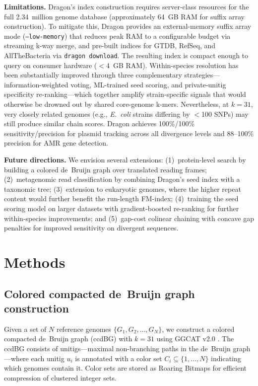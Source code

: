 \documentclass[11pt]{article}
\begin{document}
\textbf{Limitations.} Dragon's index construction requires server-class resources for the full 2.34~million genome database (approximately 64~GB RAM for suffix array construction). To mitigate this, Dragon provides an external-memory suffix array mode (\texttt{--low-memory}) that reduces peak RAM to a configurable budget via streaming k-way merge, and pre-built indices for GTDB, RefSeq, and AllTheBacteria via \texttt{dragon download}. The resulting index is compact enough to query on consumer hardware ($<$4~GB RAM). Within-species resolution has been substantially improved through three complementary strategies---information-weighted voting, ML-trained seed scoring, and private-unitig specificity re-ranking---which together amplify strain-specific signals that would otherwise be drowned out by shared core-genome k-mers. Nevertheless, at $k=31$, very closely related genomes (e.g., \textit{E.~coli} strains differing by $<$100 SNPs) may still produce similar chain scores. Dragon achieves 100\%/100\% sensitivity/precision for plasmid tracking across all divergence levels and 88--100\% precision for AMR gene detection.

\textbf{Future directions.} We envision several extensions: (1)~protein-level search by building a colored de~Bruijn graph over translated reading frames; (2)~metagenomic read classification by combining Dragon's seed index with a taxonomic tree; (3)~extension to eukaryotic genomes, where the higher repeat content would further benefit the run-length FM-index; (4)~training the seed scoring model on larger datasets with gradient-boosted re-ranking for further within-species improvements; and (5)~gap-cost colinear chaining with concave gap penalties for improved sensitivity on divergent sequences.

\section{Methods}

\subsection{Colored compacted de~Bruijn graph construction}

Given a set of $N$ reference genomes $\{G_1, G_2, \ldots, G_N\}$, we construct a colored compacted de~Bruijn graph (ccdBG) with $k = 31$ using GGCAT v2.0 \citep{cracco2023ggcat}. The ccdBG consists of unitigs---maximal non-branching paths in the de~Bruijn graph---where each unitig $u_i$ is annotated with a color set $C_i \subseteq \{1, \ldots, N\}$ indicating which genomes contain it. Color sets are stored as Roaring Bitmaps \citep{lemire2018roaring} for efficient compression of clustered integer sets.
\end{document}
